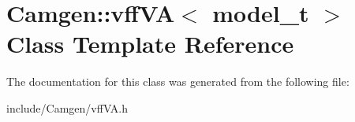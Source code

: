 \hypertarget{a00572}{\section{Camgen\-:\-:vff\-V\-A$<$ model\-\_\-t $>$ Class Template Reference}
\label{a00572}
}


The documentation for this class was generated from the following file\-:\begin{DoxyCompactItemize}
\item 
include/\-Camgen/vff\-V\-A.\-h\end{DoxyCompactItemize}
